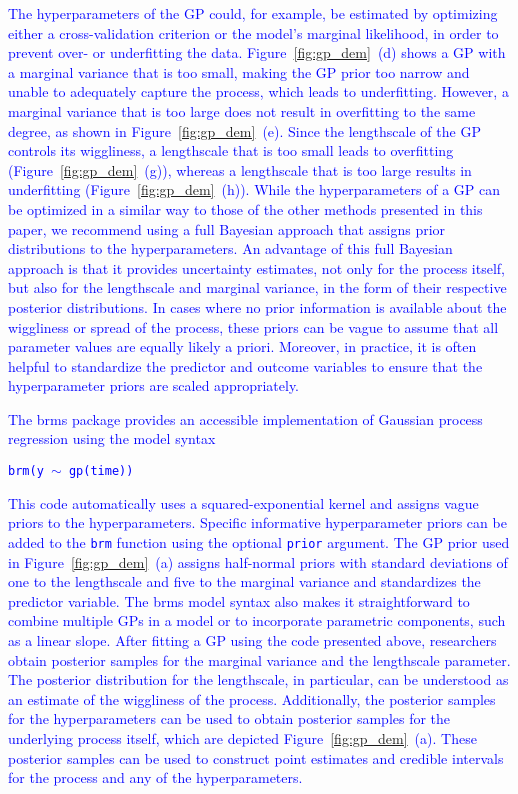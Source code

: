 \documentclass[man, floatsintext]{apa7}
\begin{document}
\textcolor{blue}{
  The hyperparameters of the GP could, for example, be estimated by optimizing
  either a cross-validation criterion or the model's marginal likelihood, in
  order to prevent over- or underfitting the data. Figure~\ref{fig:gp_dem}~(d)
  shows a GP with a marginal variance that is too small, making the GP prior
  too narrow and unable to adequately capture the process, which leads to
  underfitting. However, a marginal variance that is too large does not result
  in overfitting to the same degree, as shown in Figure~\ref{fig:gp_dem}~(e).
  Since the lengthscale of the GP controls its wiggliness, a lengthscale that
  is too small leads to overfitting (Figure~\ref{fig:gp_dem}~(g)), whereas a
  lengthscale that is too large results in underfitting
  (Figure~\ref{fig:gp_dem}~(h)). While the hyperparameters of a GP can be
  optimized in a similar way to those of the other methods presented in this
  paper, we recommend using a full Bayesian approach that assigns prior
  distributions to the hyperparameters. An advantage of this full Bayesian
  approach is that it provides uncertainty estimates, not only for the process
  itself, but also for the lengthscale and marginal variance, in the form
  of their respective posterior distributions. In cases where no prior
  information is available about the wiggliness or spread of the process, these
  priors can be vague to assume that all parameter values are equally likely a
  priori. Moreover, in practice, it is often helpful to standardize the
  predictor and outcome variables to ensure that the hyperparameter priors are
  scaled appropriately.
}

\textcolor{blue}{
  The brms package \parencite{burkner_brms_2017} provides an accessible
  implementation of
  Gaussian process regression using the model syntax}

\textcolor{blue}{\fontsize{10}{12}\selectfont\texttt{brm(y $\sim$ gp(time))}}

\noindent\textcolor{blue}{This code
  automatically uses a squared-exponential kernel and assigns vague priors to
  the hyperparameters. Specific informative hyperparameter priors can be added
  to the {\fontsize{10}{12}\selectfont\texttt{brm}} function using the optional
    {\fontsize{10}{12}\selectfont\texttt{prior}} argument. The GP prior used in
  Figure~\ref{fig:gp_dem}~(a) assigns half-normal priors with standard
  deviations of one to the lengthscale and five to the marginal variance and
  standardizes the predictor variable. The brms model syntax also
  makes it straightforward to combine multiple GPs in a model or to incorporate
  parametric components, such as a linear slope. After fitting a GP using the
  code presented above, researchers obtain posterior samples for the marginal
  variance and the lengthscale parameter. The posterior distribution for the
  lengthscale, in particular, can be understood as an estimate of the
  wiggliness of the process. Additionally, the posterior samples for the
  hyperparameters can be used to obtain posterior samples for the
  underlying process itself, which are depicted Figure~\ref{fig:gp_dem}~(a).
  These posterior samples can be used to construct
  point estimates and credible intervals for the process and any of the
  hyperparameters.
}
\end{document}
